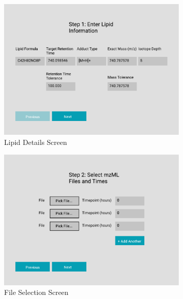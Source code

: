 \documentclass{l4proj}
\begin{document}
\begin{figure}[htb]
\centering
\begin{subfigure}{0.4\linewidth}
        \includegraphics[width=\linewidth]{dissertation/images/wireframes/wireframe1.pdf}
        \caption{Lipid Details Screen}
    \end{subfigure}
    \begin{subfigure}{0.4\linewidth}
        \includegraphics[width=\linewidth]{dissertation/images/wireframes/wireframe2.pdf}
    \caption{File Selection Screen}
    \end{subfigure}
    \begin{subfigure}{0.4\linewidth}

\end{subfigure}
\end{figure}
\end{document}
